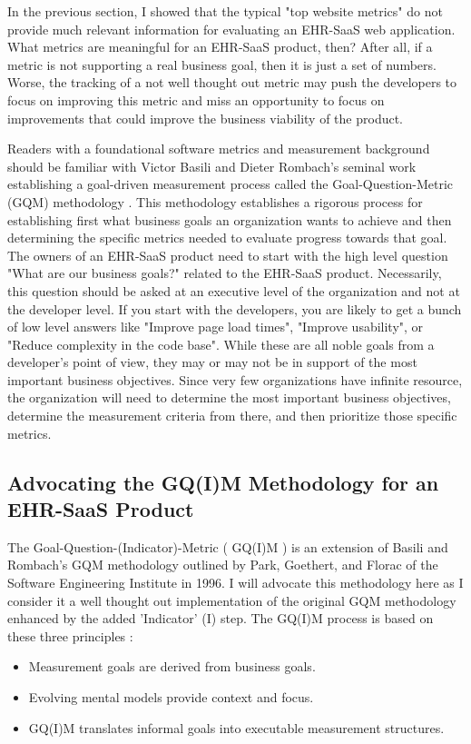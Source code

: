 \documentclass[10pt]{article}
\begin{document}
In the previous section, I showed that the typical "top website metrics" do not provide much relevant information for evaluating an EHR-SaaS web application.
What metrics are meaningful for an EHR-SaaS product, then?
After all, if a metric is not supporting a real business goal, then it is just a set of numbers.
Worse, the tracking of a not well thought out metric may push the developers to focus on improving this metric and miss an opportunity to focus on improvements that could improve the business viability of the product.

Readers with a foundational software metrics and measurement background should be familiar with Victor Basili and Dieter Rombach's seminal work establishing a goal-driven measurement process called the Goal-Question-Metric (GQM) methodology \cite{TODO}.
This methodology establishes a rigorous process for establishing first what business goals an organization wants to achieve and then determining the specific metrics needed to evaluate progress towards that goal.
The owners of an EHR-SaaS product need to start with the high level question "What are our business goals?" related to the EHR-SaaS product.
Necessarily, this question should be asked at an executive level of the organization and not at the developer level.
If you start with the developers, you are likely to get a bunch of low level answers like "Improve page load times", "Improve usability", or "Reduce complexity in the code base".
While these are all noble goals from a developer's point of view, they may or may not be in support of the most important business objectives.
Since very few organizations have infinite resource, the organization will need to determine the most important business objectives, determine the measurement criteria from there, and then prioritize those specific metrics.



\subsection{Advocating the GQ(I)M Methodology for an EHR-SaaS Product}
\label{sec:EHR-SaaS-GQM-Methodology}

The Goal-Question-(Indicator)-Metric ( GQ(I)M ) is an extension of Basili and Rombach's GQM methodology outlined by Park, Goethert, and Florac of the Software Engineering Institute in 1996.
I will advocate this methodology here as I consider it a well thought out implementation of the original GQM methodology enhanced by the added 'Indicator' (I) step.
The GQ(I)M process is based on these three principles \cite{sei-gqim}:
\begin{itemize}
	\item Measurement goals are derived from business goals.
	\item Evolving mental models provide context and focus.
	\item GQ(I)M translates informal goals into executable measurement structures.
\end{itemize}
\end{document}
